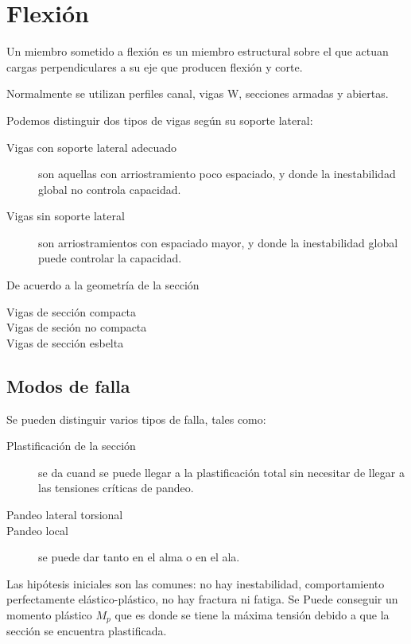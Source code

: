 \documentclass[../main.tex]{subfiles}
\begin{document}
\section{Flexión}

Un miembro sometido a flexión es un miembro estructural sobre el que actuan
cargas perpendiculares a su eje que producen flexión y corte. 

Normalmente se utilizan perfiles canal, vigas W, secciones armadas y abiertas.

Podemos distinguir dos tipos de vigas según su soporte lateral:

\begin{description}
  \item[Vigas con soporte lateral adecuado] son aquellas con arriostramiento poco
    espaciado, y donde la inestabilidad global no controla capacidad.
  \item[Vigas sin soporte lateral] son arriostramientos con espaciado mayor, y
    donde la inestabilidad global puede controlar la capacidad.
\end{description}

De acuerdo a la geometría de la sección

\begin{description}
  \item[Vigas de sección compacta] 
  \item[Vigas de seción no compacta] 
  \item[Vigas de sección esbelta] 
\end{description}

\subsection{Modos de falla}

Se pueden distinguir varios tipos de falla, tales como:

\begin{description}
  \item[Plastificación de la sección] se da cuand se puede llegar a la
    plastificación total sin necesitar de llegar a las tensiones críticas de
    pandeo.
  \item[Pandeo lateral torsional] 
  \item[Pandeo local] se puede dar tanto en el alma o en el ala.
\end{description}

Las hipótesis iniciales son las comunes: no hay inestabilidad, comportamiento
perfectamente elástico-plástico, no hay fractura ni fatiga. Se Puede conseguir
un momento plástico $M_p$ que es donde se tiene la máxima tensión debido a que 
la sección se encuentra plastificada.
\end{document}

